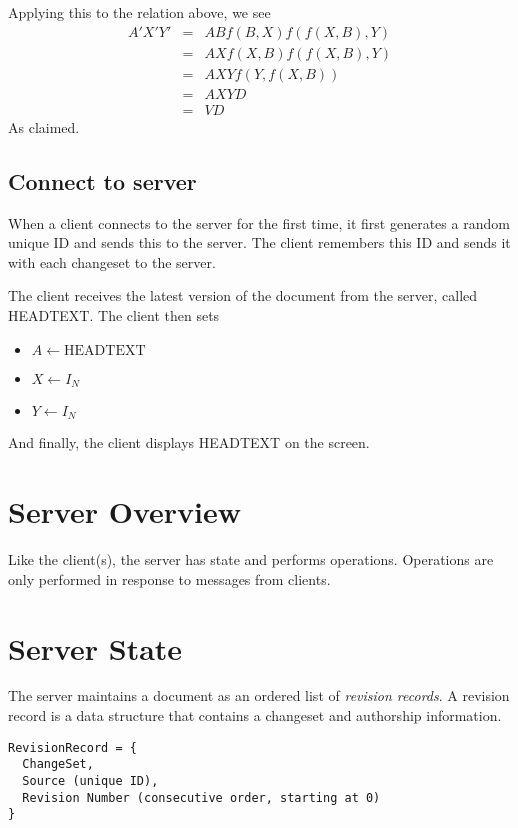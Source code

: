 \documentclass{article}
\begin{document}
Applying this to the relation above, we see
\begin{eqnarray*}
A'X'Y'&=& AB f(B,X) f(f(X,B),Y) \\
      &=&AX f(X,B) f(f(X,B),Y) \\
      &=&A X Y f(Y, f(X,B)) \\
      &=&A X Y D \\
      &=&V D 
\end{eqnarray*}
As claimed.

\subsection{Connect to server}

When a client connects to the server for the first time,
it first generates a random unique ID and sends this to
the server.  The client remembers this ID and sends it
with each changeset to the server.

The client receives the latest version of the document
from the server, called HEADTEXT.  The client then sets

\begin{itemize}
\item[] $A \leftarrow \mathrm{HEADTEXT}$
\item[] $X \leftarrow I_N$
\item[] $Y \leftarrow I_N$
\end{itemize}

And finally, the client displays HEADTEXT on the screen.

\section{Server Overview}

Like the client(s), the server has state and performs
operations.  Operations are only performed in response to
messages from clients.

\section{Server State}

The server maintains a document as an ordered list of
\emph{revision records}.  A revision record is a data
structure that contains a changeset and authorship
information.

\begin{verbatim}
RevisionRecord = {
  ChangeSet,
  Source (unique ID),
  Revision Number (consecutive order, starting at 0)
}
\end{verbatim}
\end{document}
